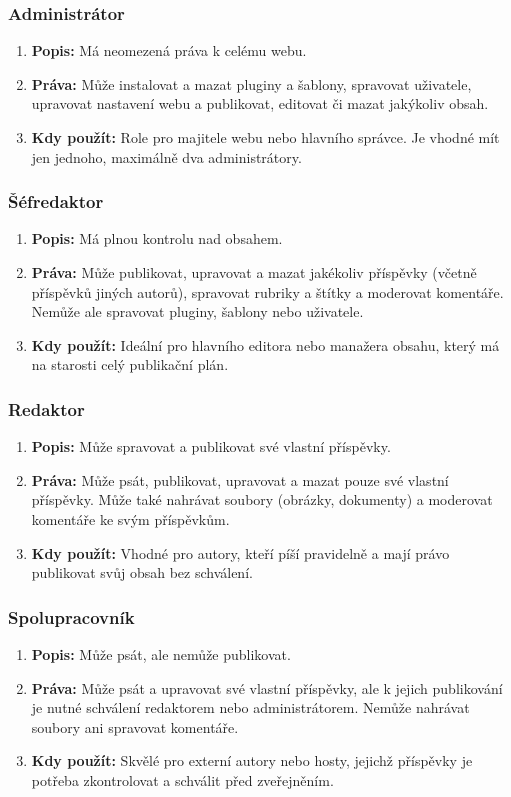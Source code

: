\documentclass[12pt,a4paper]{article}
\begin{document}
	\newpage
	\subsubsection*{Administrátor}
	\begin{enumerate}
	\item \textbf{Popis:} Má neomezená práva k celému webu.
	\item \textbf{Práva:} Může instalovat a mazat pluginy a šablony, spravovat uživatele, upravovat nastavení webu a publikovat, editovat či mazat jakýkoliv obsah.
	\item \textbf{Kdy použít:} Role pro majitele webu nebo hlavního správce. Je vhodné mít jen jednoho, maximálně dva administrátory.
	\end{enumerate}
	
	\subsubsection*{Šéfredaktor}
	\begin{enumerate}
	\item \textbf{Popis:} Má plnou kontrolu nad obsahem.
	\item \textbf{Práva:} Může publikovat, upravovat a mazat jakékoliv příspěvky (včetně příspěvků jiných autorů), spravovat rubriky a štítky a moderovat komentáře. Nemůže ale spravovat pluginy, šablony nebo uživatele.
	\item \textbf{Kdy použít:} Ideální pro hlavního editora nebo manažera obsahu, který má na starosti celý publikační plán.
	\end{enumerate}
	
	\subsubsection*{Redaktor}
	\begin{enumerate}
	\item \textbf{Popis:} Může spravovat a publikovat své vlastní příspěvky.
	\item \textbf{Práva:} Může psát, publikovat, upravovat a mazat pouze své vlastní příspěvky. Může také nahrávat soubory (obrázky, dokumenty) a moderovat komentáře ke svým příspěvkům.
	\item \textbf{Kdy použít:} Vhodné pro autory, kteří píší pravidelně a mají právo publikovat svůj obsah bez schválení.
	\end{enumerate}
	
	\subsubsection*{Spolupracovník}
	\begin{enumerate}
	\item \textbf{Popis:} Může psát, ale nemůže publikovat.
	\item \textbf{Práva:} Může psát a upravovat své vlastní příspěvky, ale k jejich publikování je nutné schválení redaktorem nebo administrátorem. Nemůže nahrávat soubory ani spravovat komentáře.
	\item \textbf{Kdy použít:} Skvělé pro externí autory nebo hosty, jejichž příspěvky je potřeba zkontrolovat a schválit před zveřejněním.
	\end{enumerate}
	
\end{document}
